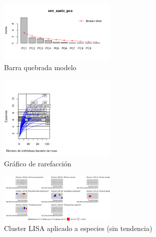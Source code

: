 \documentclass[11pt,]{article}
\begin{document}
\begin{figure}
\centering
\includegraphics[width=0.50000\textwidth]{modelo_barra_quebrada.png}
\caption{Barra quebrada modelo}
\end{figure}

\begin{figure}
\centering
\includegraphics[width=0.50000\textwidth]{grafico_de_rarefaccion.png}
\caption{Gráfico de rarefacción}
\end{figure}

\begin{figure}
\centering
\includegraphics[width=0.50000\textwidth]{cluster_LISA_aplicado_especies_transformadas_sin_tendencia.jpg}
\caption{Cluster LISA aplicado a especies (sin tendencia)}
\end{figure}




\newpage
\singlespacing 
\end{document}
